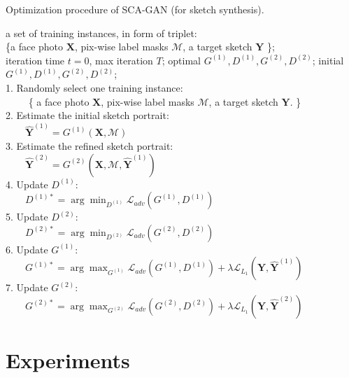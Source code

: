 \documentclass[journal]{IEEEtran}
\begin{document}
\begin{algorithm}    
  \footnotesize
  \caption{Optimization procedure of SCA-GAN (for sketch synthesis).}  
  \label{alg:optimization}
  \begin{algorithmic} 
    \Require  
    	a set of training instances, in form of triplet: \\
     	\{a face photo $\mathbf{X}$, pix-wise label masks $\mathcal{M}$, a target sketch $\mathbf{Y}$ \}; \\
     	iteration time $t=0$, max iteration $T$;
    \Ensure  
        optimal $G^{(1)}, D^{(1)}, G^{(2)}, D^{(2)}$;  
    \State initial $G^{(1)}, D^{(1)}, G^{(2)}, D^{(2)}$; 
      \\
1. Randomly select one training instance: \\
~~~~ \{ a face photo $\mathbf{X}$, pix-wise label masks $\mathcal{M}$, a target sketch $\mathbf{Y}$. \} \\
2. Estimate the initial sketch portrait: \\
~~~~$\widehat{\mathbf{Y}}^{(1)} = G^{(1)}(\mathbf{X}, \mathcal{M}) $ \\
3. Estimate the refined sketch portrait: \\
~~~~$\widehat{\mathbf{Y}}^{(2)} = G^{(2)}(\mathbf{X}, \mathcal{M}, \widehat{\mathbf{Y}}^{(1)}) $ \\
4. Update $D^{(1)}$: \\
~~~~$D^{(1)*} = \arg \min_{D^{(1)}} { \mathcal{L}_{adv}(G^{(1)}, D^{(1)}) }$  \\
5. Update $D^{(2)}$: \\
~~~~$D^{(2)*} = \arg \min_{D^{(2)}} { \mathcal{L}_{adv}(G^{(2)}, D^{(2)}) }$  \\
6. Update $G^{(1)}$: \\
~~~~$G^{(1)*} = \arg \max_{G^{(1)}} { \mathcal{L}_{adv}(G^{(1)}, D^{(1)}) + \lambda \mathcal{L}_{L_1}(\mathbf{Y}, \widehat{\mathbf{Y}}^{(1)})}$  \\
7. Update $G^{(2)}$: \\
~~~~$G^{(2)*} = \arg \max_{G^{(2)}} { \mathcal{L}_{adv}(G^{(2)}, D^{(2)}) + \lambda \mathcal{L}_{L_1}(\mathbf{Y}, \widehat{\mathbf{Y}}^{(2)})}$ 
    \EndFor 
  \end{algorithmic} 
\end{algorithm} 


\section{Experiments}
\label{sec:experiment}
\end{document}
